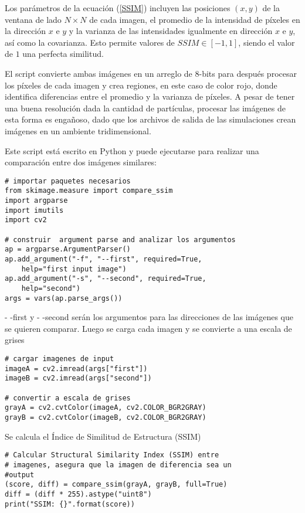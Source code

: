 \documentclass[a4paper,openright,10pt, oneside, final]{book}
\begin{document}
Los parámetros de la ecuación (\ref{SSIM}) incluyen las posiciones $(x,y)$ de la ventana de lado $N\times N$ de cada imagen, el promedio de la intensidad de píxeles en la dirección $x$ e $y$ y la varianza de las intensidades igualmente en dirección $x$ e $y$, así como la covarianza. Esto permite valores de $SSIM \in [-1,1]$, siendo el valor de $1$ una perfecta similitud. 

El script convierte ambas imágenes en un arreglo de $8$-bits para después procesar los píxeles de cada imagen y crea regiones, en este caso de color rojo, donde identifica diferencias entre el promedio y la varianza de píxeles. A pesar de tener una buena resoluci\'on dada la cantidad de partículas, procesar las imágenes de esta forma es engañoso, dado que los archivos de salida de las simulaciones crean imágenes en un ambiente tridimensional.

Este script está escrito en Python y puede ejecutarse para realizar una comparación entre dos imágenes similares:
\begin{verbatim}
# importar paquetes necesarios
from skimage.measure import compare_ssim
import argparse
import imutils
import cv2
 
# construir  argument parse and analizar los argumentos
ap = argparse.ArgumentParser()
ap.add_argument("-f", "--first", required=True,
	help="first input image")
ap.add_argument("-s", "--second", required=True,
	help="second")
args = vars(ap.parse_args())
\end{verbatim}

\textsf{- -first} y \textsf{- -second} serán los argumentos para las direcciones de las imágenes que se quieren comparar. Luego se carga cada imagen y se convierte a una escala de grises

\begin{verbatim}
# cargar imagenes de input
imageA = cv2.imread(args["first"])
imageB = cv2.imread(args["second"])
 
# convertir a escala de grises
grayA = cv2.cvtColor(imageA, cv2.COLOR_BGR2GRAY)
grayB = cv2.cvtColor(imageB, cv2.COLOR_BGR2GRAY)
\end{verbatim}

Se calcula el Índice de Similitud de Estructura (SSIM)
\begin{verbatim}
# Calcular Structural Similarity Index (SSIM) entre
# imagenes, asegura que la imagen de diferencia sea un 
#output
(score, diff) = compare_ssim(grayA, grayB, full=True)
diff = (diff * 255).astype("uint8")
print("SSIM: {}".format(score))
\end{verbatim}
\end{document}
